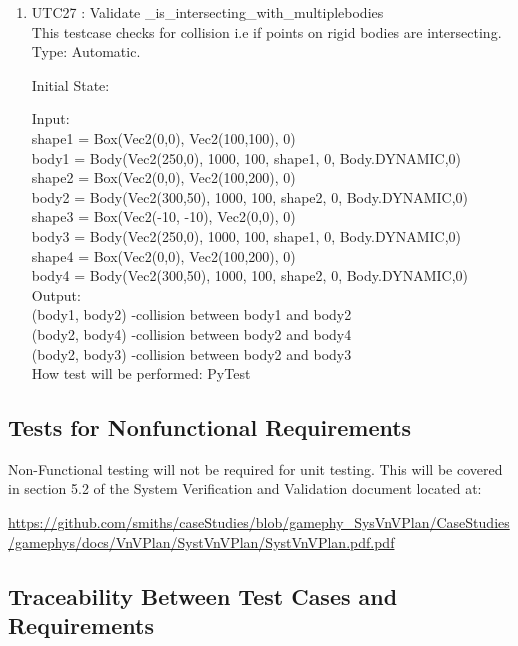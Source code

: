 \documentclass[12pt, titlepage]{article}
\begin{document}
\begin{enumerate}
\item{UTC27} {: Validate \_is\_intersecting\_with\_multiplebodies \\}
This testcase checks for collision i.e if points on rigid bodies are intersecting.\\	
Type: Automatic.

Initial State: 

Input: \\
shape1 = Box(Vec2(0,0), Vec2(100,100), 0)\\
body1 = Body(Vec2(250,0), 1000, 100, shape1, 0, Body.DYNAMIC,0)\\

shape2 = Box(Vec2(0,0), Vec2(100,200), 0)\\
body2 = Body(Vec2(300,50), 1000, 100, shape2, 0, Body.DYNAMIC,0)\\

shape3 = Box(Vec2(-10, -10), Vec2(0,0), 0)\\
body3 = Body(Vec2(250,0), 1000, 100, shape1, 0, Body.DYNAMIC,0)\\

shape4 = Box(Vec2(0,0), Vec2(100,200), 0)\\
body4 = Body(Vec2(300,50), 1000, 100, shape2, 0, Body.DYNAMIC,0)\\

Output:\\ (body1, body2) -collision between body1 and body2\\
		(body2, body4) -collision between body2 and body4\\
		(body2, body3) -collision between body2 and body3\\
How test will be performed: PyTest 
	
\end{enumerate}

\subsection{Tests for Nonfunctional Requirements}

Non-Functional testing will not be required for unit testing. This will be covered in section 5.2 of the System Verification and Validation document located at: 

\url{https://github.com/smiths/caseStudies/blob/gamephy_SysVnVPlan/CaseStudies/gamephys/docs/VnVPlan/SystVnVPlan/SystVnVPlan.pdf.pdf}

\subsection{Traceability Between Test Cases and Requirements}
\end{document}
